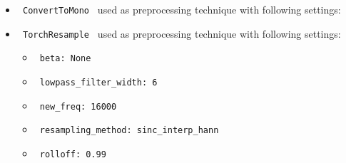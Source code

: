 \documentclass[11pt]{article}
\begin{document}
\begin{itemize}
    \item
     \verb| ConvertToMono | used as preprocessing technique with following settings:
     \begin{itemize}
           \end{itemize}
    \item
     \verb| TorchResample | used as preprocessing technique with following settings:
     \begin{itemize}
             \item
            \verb| beta: None|
             \item
            \verb| lowpass_filter_width: 6|
             \item
            \verb| new_freq: 16000|
             \item
            \verb| resampling_method: sinc_interp_hann|
             \item
            \verb| rolloff: 0.99|
           \end{itemize}
\end{itemize}
\hfill\break
\hfill\break
\end{document}
